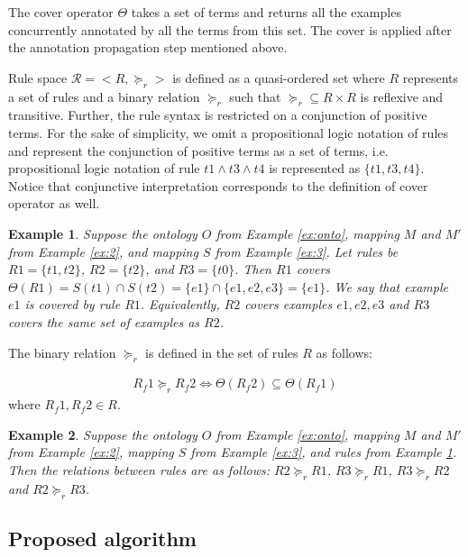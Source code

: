 \documentclass{bmcart}
\newtheorem{example}{Example}
\begin{document}
The cover operator $\Theta$ takes a set of terms and returns all the examples concurrently annotated by all the terms from this set. The cover is applied after the annotation propagation step mentioned above.


Rule space $\mathcal{R} = <R, \succeq_{r}>$ is defined as a quasi-ordered set where $R$ represents a set of rules and a binary relation $\succeq_{r}$ such that $\succeq_{r} \subseteq R \times R$ is reflexive and transitive. Further, the rule syntax is restricted on a conjunction of positive terms. For the sake of simplicity, we omit a propositional logic notation of rules and represent the conjunction of positive terms as a set of terms, i.e. propositional logic notation of rule $t1 \wedge t3 \wedge t4$ is represented as $\{t1,t3,t4\}$. Notice that conjunctive interpretation corresponds to the definition of cover operator as well.
 
\begin{example} \label{ex:4}
    Suppose the ontology $O$ from Example \ref{ex:onto}, mapping $M$ and $M'$ from Example \ref{ex:2}, and mapping $S$ from Example \ref{ex:3}. Let rules be $R1=\{t1, t2\}$, $R2=\{t2\}$, and $R3=\{t0\}$. Then $R1$ covers $\Theta(R1) = S(t1) \cap S(t2) = \{e1\} \cap \{e1, e2, e3\} = \{e1\}$. We say that example $e1$ is covered by rule $R1$. Equivalently, $R2$ covers examples $e1, e2, e3$ and $R3$ covers the same set of examples as $R2$.
\end{example}
 
 
 The binary relation $\succeq_{r}$ is defined in the set of rules $R$ as follows:
 
\begin{eqnarray} \label{eq:forder}
    R_{f}1 \succeq_{r}  R_{f}2 \iff  \Theta(R_{f}2) \subseteq \Theta(R_{f}1)
\end{eqnarray}
where  $R_{f}1, R_{f}2 \in R$.

\begin{example} \label{ex:5}
Suppose the ontology $O$ from Example \ref{ex:onto}, mapping $M$ and $M'$ from Example \ref{ex:2}, mapping $S$ from Example \ref{ex:3}, and rules from Example \ref{ex:4}. Then the relations between rules are as follows: $R2 \succeq_{r} R1$, $R3 \succeq_{r} R1$, $R3 \succeq_{r} R2$ and $R2 \succeq_{r} R3$. 
\end{example}

\subsection*{Proposed algorithm} \label{section:proposedalg}
\end{document}
